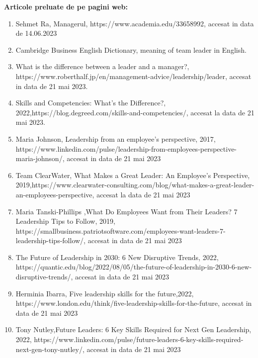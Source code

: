 \documentclass[a4paper, 12pt]{article}
\begin{document}
	\textbf{Articole preluate de pe pagini web:}
	\begin{enumerate}[1.]
	\item Sehmet Ra, Managerul, https://www.academia.edu/33658992, accesat in data de 14.06.2023

	\item Cambridge Business English Dictionary, meaning of team leader in English.

	\item What is the difference between a leader and a manager?, https://www.roberthalf.jp/en/management-advice/leadership/leader, accesat in data de 21 mai 2023.

	\item Skills and Competencies: What’s the Difference?, 2022,https://blog.degreed.com/skills-and-competencies/, accesat la data de 21 mai 2023.

	\item Maria Johnson, Leadership from an employee's perspective, 2017, https://www.linkedin.com/pulse/leadership-from-employees-perspective-maria-johnson/, accesat in data de 21 mai 2023

	\item Team ClearWater, What Makes a Great Leader: An Employee's Perspective, 2019,https://www.clearwater-consulting.com/blog/what-makes-a-great-leader-an-employees-perspective, accesat la data de 21 mai 2023
	
	\item Maria Tanski-Phillips ,What Do Employees Want from Their Leaders? 7 Leadership Tips to Follow, 2019, https://smallbusiness.patriotsoftware.com/employees-want-leaders-7-leadership-tips-follow/, accesat in data de 21 mai 2023

	\item The Future of Leadership in 2030: 6 New Disruptive Trends, 2022, https://quantic.edu/blog/2022/08/05/the-future-of-leadership-in-2030-6-new-disruptive-trends/, accesat in data de 21 mai 2023
	
	\item Herminia Ibarra, Five leadership skills for the future,2022, https://www.london.edu/think/five-leadership-skills-for-the-future, accesat in data de 21 mai 2023

	\item Tony Nutley,Future Leaders: 6 Key Skills Required for Next Gen Leadership, 2022, https://www.linkedin.com/pulse/future-leaders-6-key-skills-required-next-gen-tony-nutley/, accesat in data de 21 mai 2023


\end{enumerate}
\end{document}
